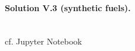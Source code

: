 \documentclass[11pt,a4paper,fleqn]{scrartcl}
\begin{document}
\paragraph{Solution V.3 \normalsize (synthetic fuels).}~\\

cf. Jupyter Notebook

\end{document}
